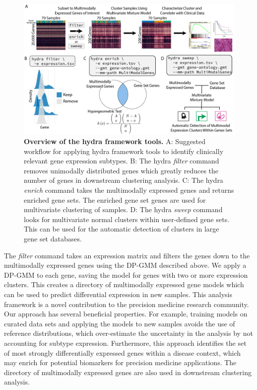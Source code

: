 \documentclass[10pt,letterpaper]{article}
\begin{document}
\begin{figure}[h!]
	\includegraphics[width=\textwidth]{"img/PNG/overview-fig"}
	\caption{{\bf Overview of the hydra framework tools.}
		A: Suggested workflow for applying hydra framework tools to identify clinically relevant gene expression subtypes. B: The hydra \textit{filter} command removes unimodally distributed genes which greatly reduces the number of genes in downstream clustering analysis. C: The hydra \textit{enrich} command takes the multimodally expressed genes and returns enriched gene sets. The enriched gene set genes are used for multivariate clustering of samples. D: The hydra 
	    \textit{sweep} command looks for multivariate normal clusters within user-defined gene sets. This can be used for the automatic detection of clusters in large gene set databases.
		\label{overview}}
\end{figure}

The \textit{filter} command takes an expression matrix and filters the genes down to the multimodally expressed genes using the DP-GMM described above. We apply a DP-GMM to each gene, saving the model for genes with two or more expression clusters. This creates a directory of multimodally expressed gene models which can be used to predict differential expression in new samples. This analysis framework is a novel contribution to the precision medicine research community. Our approach has several beneficial properties. For example, training models on curated data sets and applying the models to new samples avoids the use of reference distributions, which over-estimate the uncertainty in the analysis by not accounting for subtype expression. Furthermore, this approach identifies the set of most strongly differentially expressed genes within a disease context, which may enrich for potential biomarkers for precision medicine applications. The directory of multimodally expressed genes are also used in downstream clustering analysis. 
\end{document}
